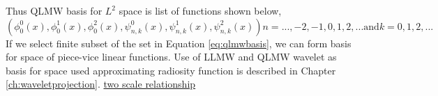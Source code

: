 Thus QLMW basis for $L^2$ space is list of functions shown below,
\begin{equation}\label{eq:qlmwbasis}
(\phi^0_0(x),\phi^1_0(x),\phi^2_0(x),\psi^0_{n,k}(x),\psi^1_{n,k}(x),\psi^2_{n,k}(x)) n=..., -2, -1, 0, 1, 2,... \text{and} k=0,1,2,...
\end{equation}
If we select finite subset of the set in Equation \ref{eq:qlmwbasis}, we can form basis for space of piece-vice linear functions. 
Use of LLMW and QLMW wavelet as basis for space used approximating radiosity function is described in Chapter \ref{ch:waveletprojection}.
\underline{two scale relationship}
 
 